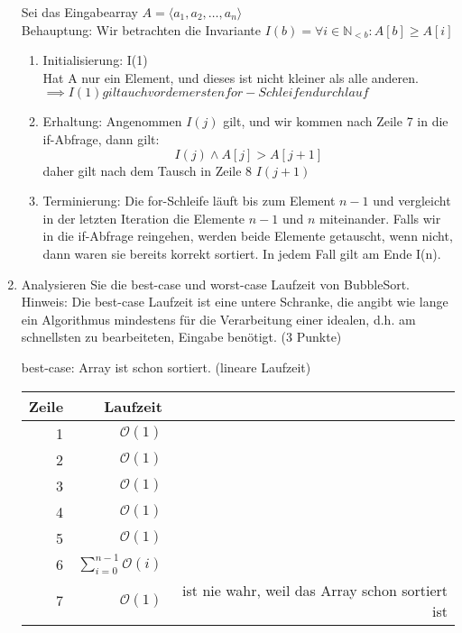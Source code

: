 \documentclass[ngerman,landscape,twocolumn]{adtexsheet}
\begin{document}
\begin{question}
\begin{enumerate}
            Sei das Eingabearray $A = \langle a_1, a_2, \ldots, a_n\rangle$\\
            Behauptung: Wir betrachten die Invariante $I(b) = \forall i \in \mathbb{N}_{<b} :  A[b] \geq A[i]$
            \begin{enumerate}[label=\arabic*)]
            \item Initialisierung: I(1)\\
            Hat A nur ein Element, und dieses ist nicht kleiner als alle anderen. $\implies I(1) gilt auch vor dem ersten for-Schleifendurchlauf$
            \item Erhaltung: Angenommen $I(j)$ gilt, und wir kommen nach Zeile 7 in die if-Abfrage, dann gilt:
            $$I(j) \land A[j] > A[j+1]$$
            daher gilt nach dem Tausch in Zeile 8 $I(j+1)$
            \item Terminierung: Die for-Schleife läuft bis zum Element $n-1$ und vergleicht in der letzten Iteration die Elemente $n-1$ und $n$ miteinander. Falls wir in die if-Abfrage reingehen, werden beide Elemente getauscht, wenn nicht, dann waren sie bereits korrekt sortiert. In jedem Fall gilt am Ende I(n). 
            \end{enumerate}
            
	\newpage
            
            \item
            Analysieren Sie die best-case und worst-case Laufzeit von BubbleSort. Hinweis: Die best-case Laufzeit ist eine untere Schranke, die angibt wie lange ein Algorithmus mindestens für die Verarbeitung einer idealen, d.h. am schnellsten zu bearbeiteten, Eingabe benötigt. (3 Punkte)

            best-case: Array ist schon sortiert. (lineare Laufzeit)
    
            \begin{tabular}{r|r|r}
            Zeile & Laufzeit & \\ \hline
            1  & $\mathcal{O}(1)$ & \\
            2  & $\mathcal{O}(1)$ & \\
            3  & $\mathcal{O}(1)$ & \\
            4  & $\mathcal{O}(1)$ & \\
            5  & $\mathcal{O}(1)$ & \\
            6  & $\sum_{i=0}^{n-1} \mathcal{O}(i)$ & \\
            7  & $\mathcal{O}(1)$ & ist nie wahr, weil das Array schon sortiert ist \\
            \end{tabular}
            

\end{enumerate}
\end{question}
\end{document}
